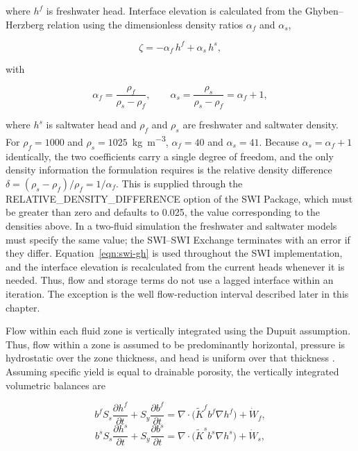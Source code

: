 \noindent where $h^{f}$ is freshwater head. Interface elevation is calculated from the Ghyben--Herzberg relation using the dimensionless density ratios $\alpha_{f}$ and $\alpha_{s}$,

\begin{equation}
\label{eqn:swi-gh}
\zeta = -\alpha_{f}\,h^{f} + \alpha_{s}\,h^{s},
\end{equation}

\noindent with

\begin{equation}
\label{eqn:swi-alpha}
\alpha_{f}=\frac{\rho_{f}}{\rho_{s}-\rho_{f}},
\qquad
\alpha_{s}=\frac{\rho_{s}}{\rho_{s}-\rho_{f}}=\alpha_{f}+1,
\end{equation}

\noindent where $h^{s}$ is saltwater head and $\rho_{f}$ and $\rho_{s}$ are freshwater and saltwater density. For $\rho_{f}=1000$ and $\rho_{s}=1025$~\si{\kilogram\per\cubic\meter}, $\alpha_{f}=40$ and $\alpha_{s}=41$. Because $\alpha_{s}=\alpha_{f}+1$ identically, the two coefficients carry a single degree of freedom, and the only density information the formulation requires is the relative density difference $\delta=(\rho_{s}-\rho_{f})/\rho_{f}=1/\alpha_{f}$. This is supplied through the RELATIVE\_DENSITY\_DIFFERENCE option of the SWI Package, which must be greater than zero and defaults to 0.025, the value corresponding to the densities above. In a two-fluid simulation the freshwater and saltwater models must specify the same value; the SWI--SWI Exchange terminates with an error if they differ. Equation~\ref{eqn:swi-gh} is used throughout the SWI implementation, and the interface elevation is recalculated from the current heads whenever it is needed. Thus, flow and storage terms do not use a lagged interface within an iteration. The exception is the well flow-reduction interval described later in this chapter.

Flow within each fluid zone is vertically integrated using the Dupuit assumption. Thus, flow within a zone is assumed to be predominantly horizontal, pressure is hydrostatic over the zone thickness, and head is uniform over that thickness \citep{bear1979}. Assuming specific yield is equal to drainable porosity, the vertically integrated volumetric balances are

\begin{equation}
\label{eqn:swi-pdef}
b^{f}S_{s}\frac{\partial h^{f}}{\partial t}+S_{y}\frac{\partial b^{f}}{\partial t}
=\nabla\!\cdot\!\big(\tilde K^{f}b^{f}\nabla h^{f}\big)+\dot W_{f},
\end{equation}
\begin{equation}
\label{eqn:swi-pdes}
b^{s}S_{s}\frac{\partial h^{s}}{\partial t}+S_{y}\frac{\partial b^{s}}{\partial t}
=\nabla\!\cdot\!\big(\tilde K^{s}b^{s}\nabla h^{s}\big)+\dot W_{s},
\end{equation}

